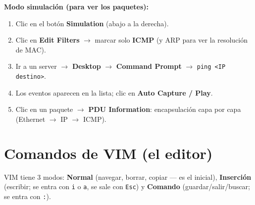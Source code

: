 \textbf{Modo simulación (para ver los paquetes):}
\begin{enumerate}
  \item Clic en el botón \textbf{Simulation} (abajo a la derecha).
  \item Clic en \textbf{Edit Filters} $\rightarrow$ marcar solo \textbf{ICMP} (y ARP para ver la resolución de MAC).
  \item Ir a un server $\rightarrow$ \textbf{Desktop} $\rightarrow$ \textbf{Command Prompt} $\rightarrow$ \texttt{ping <IP destino>}.
  \item Los eventos aparecen en la lista; clic en \textbf{Auto Capture / Play}.
  \item Clic en un paquete $\rightarrow$ \textbf{PDU Information}: encapsulación capa por capa (Ethernet $\rightarrow$ IP $\rightarrow$ ICMP).
\end{enumerate}

\section{Comandos de VIM (el editor)}

VIM tiene 3 modos: \textbf{Normal} (navegar, borrar, copiar --- es el inicial), \textbf{Inserción} (escribir; se entra con \texttt{i} o \texttt{a}, se sale con \texttt{Esc}) y \textbf{Comando} (guardar/salir/buscar; se entra con \texttt{:}).

